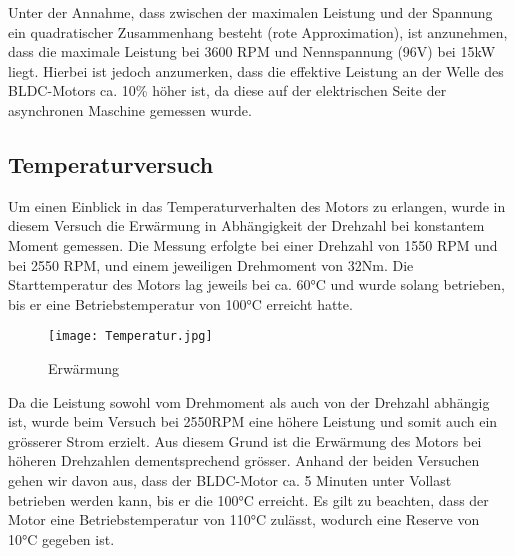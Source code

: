 Unter der Annahme, dass zwischen der maximalen Leistung und der Spannung ein quadratischer Zusammenhang besteht (rote Approximation), ist anzunehmen, dass die maximale Leistung bei 3600 RPM und Nennspannung (96V) bei 15kW liegt. Hierbei ist jedoch anzumerken, dass die effektive Leistung an der Welle des BLDC-Motors ca. 10\% höher ist, da diese auf der elektrischen Seite der asynchronen Maschine gemessen wurde.

\subsection{Temperaturversuch}
Um einen Einblick in das Temperaturverhalten des Motors zu erlangen, wurde in diesem Versuch die Erwärmung in Abhängigkeit der Drehzahl bei konstantem Moment gemessen. Die Messung erfolgte bei einer Drehzahl von 1550 RPM und bei 2550 RPM, und einem jeweiligen Drehmoment von 32Nm. Die Starttemperatur des Motors lag jeweils bei ca. 60°C und wurde solang betrieben, bis er eine Betriebstemperatur von 100°C erreicht hatte.


\begin{figure}[H]
	\centering
	\texttt{[image: Temperatur.jpg]}
	\caption{Erwärmung}\label{fig:Temperatur}
\end{figure}


Da die Leistung sowohl vom Drehmoment als auch von der Drehzahl abhängig ist, wurde beim Versuch bei 2550RPM eine höhere Leistung und somit auch ein grösserer Strom erzielt. Aus diesem Grund ist die Erwärmung des Motors bei höheren Drehzahlen dementsprechend grösser. Anhand der beiden Versuchen gehen wir davon aus, dass der BLDC-Motor ca. 5 Minuten unter Vollast betrieben werden kann, bis er die 100°C erreicht. Es gilt zu beachten, dass der Motor eine Betriebstemperatur von 110°C zulässt, wodurch eine Reserve von 10°C gegeben ist.
 